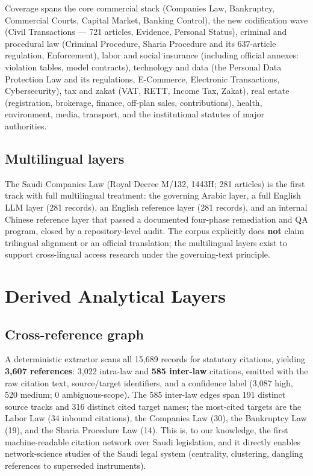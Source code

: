 \documentclass[11pt]{article}
\begin{document}
Coverage spans the core commercial stack (Companies Law, Bankruptcy,
Commercial Courts, Capital Market, Banking Control), the new codification
wave (Civil Transactions --- 721 articles, Evidence, Personal Status),
criminal and procedural law (Criminal Procedure, Sharia Procedure and its
637-article regulation, Enforcement), labor and social insurance (including
official annexes: violation tables, model contracts), technology and data
(the Personal Data Protection Law and its regulations, E-Commerce,
Electronic Transactions, Cybersecurity), tax and zakat (VAT, RETT, Income
Tax, Zakat), real estate (registration, brokerage, finance, off-plan sales,
contributions), health, environment, media, transport, and the
institutional statutes of major authorities.

\subsection{Multilingual layers}

The Saudi Companies Law (Royal Decree M/132, 1443H; 281 articles) is the
first track with full multilingual treatment: the governing Arabic layer, a
full English LLM layer (281 records), an English reference layer (281
records), and an internal Chinese reference layer that passed a documented
four-phase remediation and QA program, closed by a repository-level audit.
The corpus explicitly does \textbf{not} claim trilingual alignment or an
official translation; the multilingual layers exist to support
cross-lingual access research under the governing-text principle.

\section{Derived Analytical Layers}
\label{sec:layers}

\subsection{Cross-reference graph}

A deterministic extractor scans all 15{,}689 records for statutory
citations, yielding \textbf{3{,}607 references}: 3{,}022 intra-law and
\textbf{585 inter-law} citations, emitted with the raw citation text,
source/target identifiers, and a confidence label (3{,}087 high, 520
medium; 0 ambiguous-scope). The 585 inter-law edges span 191 distinct
source tracks and 316 distinct cited target names; the most-cited targets
are the Labor Law (34 inbound citations), the Companies Law (30), the
Bankruptcy Law (19), and the Sharia Procedure Law (14). This is, to our
knowledge, the first machine-readable citation network over Saudi
legislation, and it directly enables network-science studies of the Saudi
legal system (centrality, clustering, dangling references to superseded
instruments).
\end{document}
